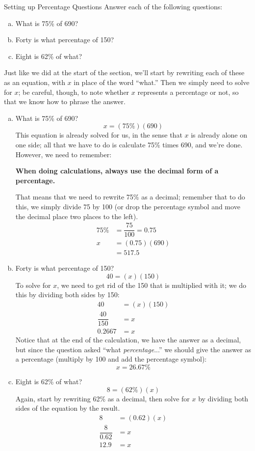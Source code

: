 \begin{example}[https://www.youtube.com/watch?v=CiMr5erFgpE&list=PLfmpjsIzhztsZtnb7HnXrQ8SLoiOCIcAM&index=3]{Setting up Percentage Questions}
Answer each of the following questions:
\begin{enumerate}[(a)]
\item What is 75\% of 690?
\item Forty is what percentage of 150?
\item Eight is 62\% of what?
\end{enumerate}

\sol
Just like we did at the start of the section, we'll start by rewriting each of these as an equation, with $x$ in place of the word ``what.''  Then we simply need to solve for $x$; be careful, though, to note whether $x$ represents a percentage or not, so that we know how to phrase the answer.

\begin{enumerate}[(a)]
\item What is 75\% of 690?
\[x = (75\%)(690)\]
This equation is already solved for us, in the sense that $x$ is already alone on one side; all that we have to do is calculate 75\% times 690, and we're done.  However, we need to remember:
\begin{center}
\textbf{When doing calculations, always use the decimal form of a percentage.}
\end{center}
That means that we need to rewrite 75\% as a decimal; remember that to do this, we simply divide 75 by 100 (or drop the percentage symbol and move the decimal place two places to the left).
\begin{align*}
75\% &= \dfrac{75}{100} = 0.75\\
x &= (0.75)(690)\\
&= \boxed{517.5}
\end{align*}
\pagebreak

\item Forty is what percentage of 150?
\[40 = (x)(150)\]
To solve for $x$, we need to get rid of the 150 that is multiplied with it; we do this by dividing both sides by 150:
\begin{align*}
40 &= (x)(150)\\
\dfrac{40}{150} &= x\\
0.2667 &= x
\end{align*}
Notice that at the end of the calculation, we have the answer as a decimal, but since the question asked ``what \emph{percentage}...'' we should give the answer as a percentage (multiply by 100 and add the percentage symbol):
\[x = \boxed{26.67\%}\]

\item Eight is 62\% of what?
\[8 = (62\%)(x)\]
Again, start by rewriting 62\% as a decimal, then solve for $x$ by dividing both sides of the equation by the result.
\begin{align*}
8 &= (0.62)(x)\\
\dfrac{8}{0.62} &= x\\
\boxed{12.9} &= x
\end{align*}
\end{enumerate}
\end{example}

